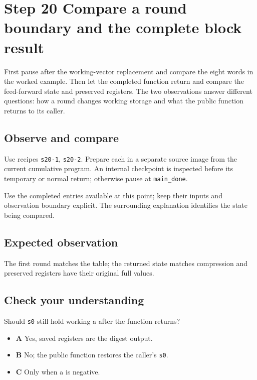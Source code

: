 \section{Step 20 Compare a round boundary and the complete block result}\label{sha-s20}

First pause after the working-vector replacement and compare the eight words in the worked example. Then let the completed function return and compare the feed-forward state and preserved registers. The two observations answer different questions: how a round changes working storage and what the public function returns to its caller.

\subsection{Observe and compare}
Use recipes \texttt{s20-1}, \texttt{s20-2}. Prepare each in a separate source image from the current cumulative program. An internal checkpoint is inspected before its temporary or normal return; otherwise pause at \texttt{main\_done}.

Use the completed entries available at this point; keep their inputs and observation boundary explicit. The surrounding explanation identifies the state being compared.

\subsection{Expected observation}
The first round matches the table; the returned state matches compression and preserved registers have their original full values.

\subsection{Check your understanding}
Should \texttt{s0} still hold working a after the function returns?

\begin{itemize}
\item \textbf{A} Yes, saved registers are the digest output.
\item \textbf{B} No; the public function restores the caller's \texttt{s0}.
\item \textbf{C} Only when a is negative.
\end{itemize}
